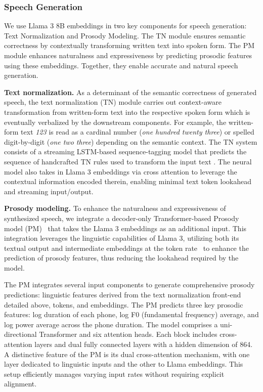 \subsubsection{Speech Generation}

We use Llama 3 8B embeddings in two key components for speech generation: Text Normalization and Prosody Modeling. The TN module ensures semantic correctness by contextually transforming written text into spoken form. The PM module enhances naturalness and expressiveness by predicting prosodic features using these embeddings. Together, they enable accurate and natural speech generation.

\textbf{Text normalization.}
As a determinant of the semantic correctness of generated speech, the text normalization (TN) module carries out context-aware transformation from written-form text into the respective spoken form which is eventually verbalized by the downstream components. For example, the written-form text \emph{123} is read as a cardinal number (\emph{one hundred twenty three}) or spelled digit-by-digit (\emph{one two three}) depending on the semantic context. The TN system consists of a streaming LSTM-based sequence-tagging model that predicts the sequence of handcrafted TN rules used to transform the input text \citep{kang2024tn}. The neural model also takes in Llama 3 embeddings via cross attention to leverage the contextual information encoded therein, enabling minimal text token lookahead and streaming input/output.

\textbf{Prosody modeling.}
\label{sec:tts:pm}
To enhance the naturalness and expressiveness of synthesized speech, we integrate a decoder-only Transformer-based Prosody model (PM)~\citep{radford2021learning} that takes the Llama 3 embeddings as an additional input. This integration leverages the linguistic capabilities of Llama 3, utilizing both its textual output and intermediate embeddings at the token rate~\citep{devlin2018bert, dong2019unified, raffel2020exploring, guo2023prompttts} to enhance the prediction of prosody features, thus reducing the lookahead required by the model.

The PM integrates several input components to generate comprehensive prosody predictions: linguistic features derived from the text normalization front-end detailed above, tokens, and embeddings. The PM predicts three key prosodic features: log duration of each phone, log F0 (fundamental frequency) average, and log power average across the phone duration. The model comprises a uni-directional Transformer and six attention heads. Each block includes cross-attention layers and dual fully connected layers with a hidden dimension of 864. A distinctive feature of the PM is its dual cross-attention mechanism, with one layer dedicated to linguistic inputs and the other to Llama embeddings. This setup efficiently manages varying input rates without requiring explicit alignment.
